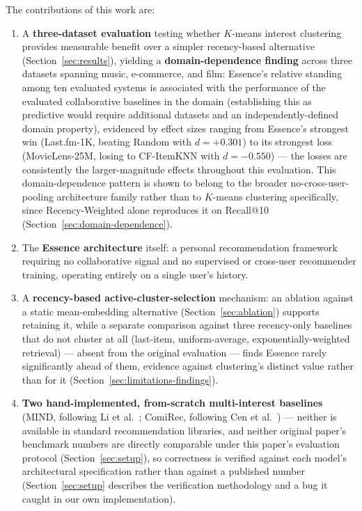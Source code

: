 \documentclass[11pt,a4paper]{article}
\begin{document}
The contributions of this work are:
\begin{enumerate}[leftmargin=*, itemsep=2pt]
  \item A \textbf{three-dataset evaluation} testing whether $K$-means
        interest clustering provides measurable benefit over a simpler
        recency-based alternative (Section~\ref{sec:results}), yielding a
        \textbf{domain-dependence finding} across three datasets spanning
        music, e-commerce, and film: Essence's relative standing among ten
        evaluated systems is associated with the performance of the
        evaluated collaborative baselines in the domain (establishing this as
        predictive would require additional datasets and an
        independently-defined domain property), evidenced by effect sizes
        ranging from Essence's strongest win
        (Last.fm-1K, beating Random with $d=+0.301$) to its strongest
        loss (MovieLens-25M, losing to CF-ItemKNN with $d=-0.550$) ---
        the losses are consistently the larger-magnitude effects
        throughout this evaluation. This domain-dependence pattern is
        shown to belong to the broader no-cross-user-pooling architecture
        family rather than to $K$-means clustering specifically, since
        Recency-Weighted alone reproduces it on Recall@10
        (Section~\ref{sec:domain-dependence}).
  \item The \textbf{Essence architecture} itself: a personal recommendation
        framework requiring no collaborative signal and no supervised or cross-user
        recommender training, operating entirely on a single user's history.
  \item A \textbf{recency-based active-cluster-selection} mechanism: an
        ablation against a static mean-embedding alternative
        (Section~\ref{sec:ablation}) supports retaining it, while a
        separate comparison against three recency-only baselines that do
        not cluster at all (last-item, uniform-average,
        exponentially-weighted retrieval) --- absent from the original
        evaluation --- finds Essence rarely significantly ahead of them,
        evidence against clustering's distinct value rather than for it
        (Section~\ref{sec:limitations-findings}).
  \item \textbf{Two hand-implemented, from-scratch multi-interest baselines}
        (MIND, following Li et al.~\cite{li2019}; ComiRec, following Cen et
        al.~\cite{cen2020}) --- neither is available in standard
        recommendation libraries, and neither original paper's benchmark
        numbers are directly comparable under this paper's evaluation
        protocol (Section~\ref{sec:setup}), so correctness is verified
        against each model's architectural specification rather than
        against a published number (Section~\ref{sec:setup} describes the
        verification methodology and a bug it caught in our own
        implementation).
\end{enumerate}
\end{document}
